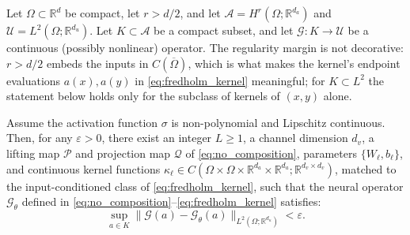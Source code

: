 \begin{theorem}
\label{thm:no_universality}
Let $\Omega \subset \mathbb{R}^d$ be compact, let $r > d/2$, and let $\mathcal{A} = H^r(\Omega; \mathbb{R}^{d_a})$ and $\mathcal{U} = L^2(\Omega; \mathbb{R}^{d_u})$. Let $K \subset \mathcal{A}$ be a compact subset, and let $\mathcal{G} : K \to \mathcal{U}$ be a continuous (possibly nonlinear) operator. The regularity margin is not decorative: $r > d/2$ embeds the inputs in $C(\overline{\Omega})$, which is what makes the kernel's endpoint evaluations $a(x), a(y)$ in \eqref{eq:fredholm_kernel} meaningful; for $K \subset L^2$ the statement below holds only for the subclass of kernels of $(x,y)$ alone.

Assume the activation function $\sigma$ is non-polynomial and Lipschitz continuous. Then, for any $\varepsilon > 0$, there exist an integer $L \ge 1$, a channel dimension $d_v$, a lifting map $\mathcal{P}$ and projection map $\mathcal{Q}$ of \eqref{eq:no_composition}, parameters $\{W_\ell, b_\ell\}$, and continuous kernel functions $\kappa_\ell \in C(\Omega \times \Omega \times \mathbb{R}^{d_a} \times \mathbb{R}^{d_a}; \mathbb{R}^{d_v \times d_v})$, matched to the input-conditioned class of \eqref{eq:fredholm_kernel}, such that the neural operator $\mathcal{G}_\theta$ defined in \eqref{eq:no_composition}--\eqref{eq:fredholm_kernel} satisfies:
\begin{equation}
  \label{eq:ch04-unif-bound}
  \sup_{a \in K} \|\mathcal{G}(a) - \mathcal{G}_\theta(a)\|_{L^2(\Omega; \mathbb{R}^{d_u})} < \varepsilon.
\end{equation}
\end{theorem}

